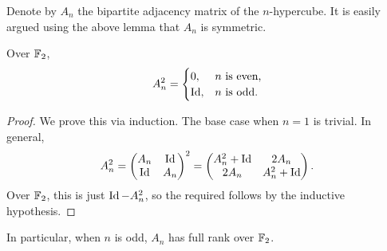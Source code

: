 Denote by $A_n$ the bipartite adjacency matrix of the $n$-hypercube. It is easily argued using the above lemma that $A_n$ is symmetric.

\begin{lemma}
	Over $\mathbb{F}_2$,
	\[ A_n^2 = \begin{cases} 0, & n\text{ is even,} \\ \operatorname{Id}, & n\text{ is odd.} \end{cases}  \]
\end{lemma}
\begin{proof}
	We prove this via induction. The base case when $n = 1$ is trivial. In general,
	\[ A_n^2 = \begin{pmatrix} A_n & \operatorname{Id} \\ \operatorname{Id} & A_n \end{pmatrix}^2 = \begin{pmatrix} A_n^2 + \operatorname{Id} & 2A_n \\ 2A_n & A_n^2 + \operatorname{Id} \end{pmatrix}. \]
	Over $\mathbb{F}_2$, this is just $\operatorname{Id} - A_n^2$, so the required follows by the inductive hypothesis.
\end{proof}

In particular, when $n$ is odd, $A_n$ has full rank over $\mathbb{F}_2$. 

